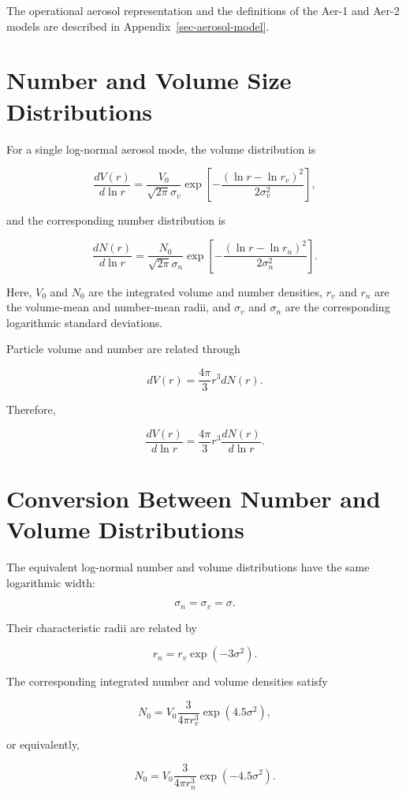 \documentclass[
  11pt,
  letterpaper,
]{scrreprt}
\begin{document}
The operational aerosol representation and the definitions of the Aer-1
and Aer-2 models are described in Appendix~\ref{sec-aerosol-model}.

\section{Number and Volume Size
Distributions}\label{number-and-volume-size-distributions}

For a single log-normal aerosol mode, the volume distribution is

\[
\frac{dV(r)}{d\ln r}
=
\frac{V_0}{\sqrt{2\pi}\sigma_v}
\exp
\left[
-\frac{(\ln r-\ln r_v)^2}{2\sigma_v^2}
\right],
\]

and the corresponding number distribution is

\[
\frac{dN(r)}{d\ln r}
=
\frac{N_0}{\sqrt{2\pi}\sigma_n}
\exp
\left[
-\frac{(\ln r-\ln r_n)^2}{2\sigma_n^2}
\right].
\]

Here, \(V_0\) and \(N_0\) are the integrated volume and number
densities, \(r_v\) and \(r_n\) are the volume-mean and number-mean
radii, and \(\sigma_v\) and \(\sigma_n\) are the corresponding
logarithmic standard deviations.

Particle volume and number are related through

\[
dV(r)
=
\frac{4\pi}{3}r^3dN(r).
\]

Therefore,

\[
\frac{dV(r)}{d\ln r}
=
\frac{4\pi}{3}r^3
\frac{dN(r)}{d\ln r}.
\]

\section{Conversion Between Number and Volume
Distributions}\label{conversion-between-number-and-volume-distributions}

The equivalent log-normal number and volume distributions have the same
logarithmic width:

\[
\sigma_n=\sigma_v=\sigma.
\]

Their characteristic radii are related by

\[
r_n
=
r_v\exp(-3\sigma^2).
\]

The corresponding integrated number and volume densities satisfy

\[
N_0
=
V_0
\frac{3}{4\pi r_v^3}
\exp(4.5\sigma^2),
\]

or equivalently,

\[
N_0
=
V_0
\frac{3}{4\pi r_n^3}
\exp(-4.5\sigma^2).
\]
\end{document}
